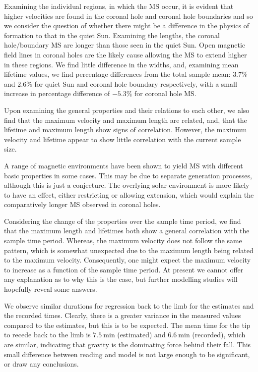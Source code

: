 Examining the individual regions, in which the MS occur, it is evident that higher velocities are found in the coronal hole and coronal hole boundaries and so we consider the question of whether there might be a difference in the physics of formation to that in the quiet Sun. Examining the lengths, the coronal hole/boundary MS are longer than those seen in the quiet Sun. Open magnetic field lines in coronal holes are the likely cause allowing the MS to extend higher in these regions. We find little difference in the widths, and, examining mean lifetime values, we find percentage differences from the total sample mean: $3.7\%$ and $2.6\%$ for quiet Sun and coronal hole boundary respectively, with a small increase in percentage difference of $-5.3\%$ for coronal hole MS.

Upon examining the general properties and their relations to each other, we also find that the maximum velocity and maximum length are related, and, that the lifetime and maximum length show signs of correlation. However, the maximum velocity and lifetime appear to show little correlation with the current sample size.

A range of magnetic environments have been shown to yield MS with different basic properties in some cases. This may be due to separate generation processes, although this is just a conjecture. The overlying solar environment is more likely to have an effect, either restricting or allowing extension, which would explain the comparatively longer MS observed in coronal holes.

Considering the change of the properties over the sample time period, we find that the maximum length and lifetimes both show a general correlation with the sample time period. Whereas, the maximum velocity does not follow the same pattern, which is somewhat unexpected due to the maximum length being related to the maximum velocity. Consequently, one might expect the maximum velocity to increase as a function of the sample time period. At present we cannot offer any explanation as to why this is the case, but further modelling studies will hopefully reveal some answers.

We observe similar durations for regression back to the limb for the estimates and the recorded times. 
Clearly, there is a greater variance in the measured values compared to the estimates, but this is to be expected.
The mean time for the tip to recede back to the limb is $7.5\ \textrm{min}$ (estimated) and $6.6\ \textrm{min}$ (recorded), which are similar, indicating that gravity is the dominating force behind their fall. 
This small difference between reading and model is not large enough to be significant, or draw any conclusions.

